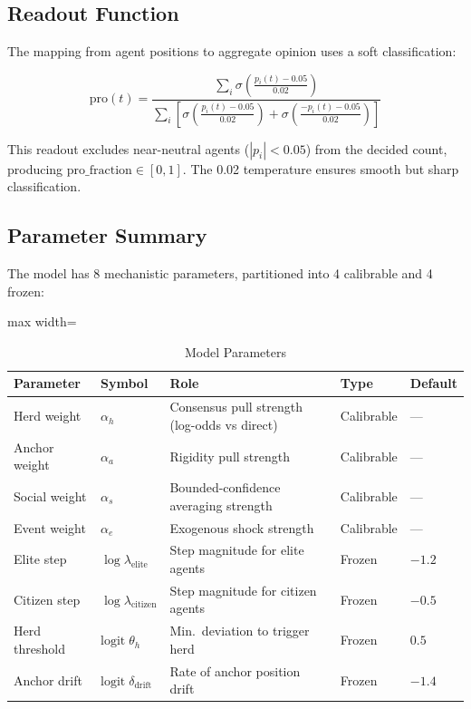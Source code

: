 \documentclass[12pt]{article}
\begin{document}
\subsection{Readout Function}

The mapping from agent positions to aggregate opinion uses a soft classification:

\begin{equation}\label{eq:12}
\text{pro}(t) = \frac{\sum_i \sigma\!\left(\frac{p_i(t) - 0.05}{0.02}\right)}{\sum_i \left[\sigma\!\left(\frac{p_i(t) - 0.05}{0.02}\right) + \sigma\!\left(\frac{-p_i(t) - 0.05}{0.02}\right)\right]}
\end{equation}

This readout excludes near-neutral agents ($|p_i| < 0.05$) from the decided count, producing $\text{pro\_fraction} \in [0, 1]$. The 0.02 temperature ensures smooth but sharp classification.

\subsection{Parameter Summary}

The model has 8 mechanistic parameters, partitioned into 4 calibrable and 4 frozen:

\begin{table}[H]
\centering
\caption{Model Parameters}
\label{tab:params}
\begin{adjustbox}{max width=\textwidth}
\begin{tabular}{@{}llp{5.5cm}ll@{}}
\toprule
Parameter & Symbol & Role & Type & Default \\
\midrule
Herd weight & $\alpha_h$ & Consensus pull strength (log-odds vs direct) & Calibrable & --- \\
Anchor weight & $\alpha_a$ & Rigidity pull strength & Calibrable & --- \\
Social weight & $\alpha_s$ & Bounded-confidence averaging strength & Calibrable & --- \\
Event weight & $\alpha_e$ & Exogenous shock strength & Calibrable & --- \\
Elite step & $\log \lambda_{\text{elite}}$ & Step magnitude for elite agents & Frozen & $-1.2$ \\
Citizen step & $\log \lambda_{\text{citizen}}$ & Step magnitude for citizen agents & Frozen & $-0.5$ \\
Herd threshold & $\text{logit}\;\theta_h$ & Min.\ deviation to trigger herd & Frozen & $0.5$ \\
Anchor drift & $\text{logit}\;\delta_{\text{drift}}$ & Rate of anchor position drift & Frozen & $-1.4$ \\
\bottomrule
\end{tabular}
\end{adjustbox}
\end{table}
\end{document}
